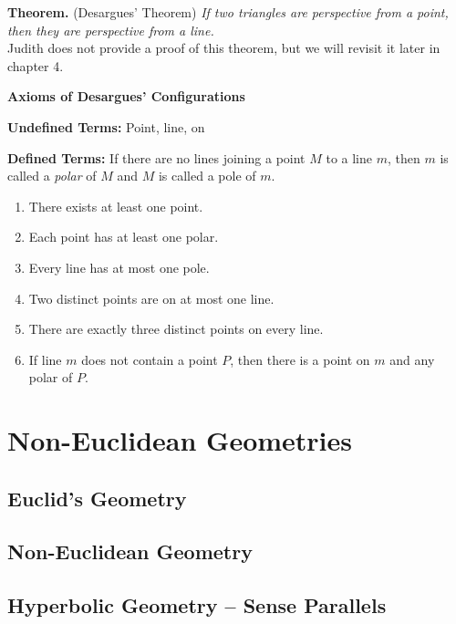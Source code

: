 \documentclass[12pt]{book}
\def\header #1{\noindent\textbf{#1}}
\begin{document}
\header{Theorem.} (Desargues' Theorem) \textit{If two triangles are perspective from a point, then they are perspective from a line.}\\

\noindent Judith does not provide a proof of this theorem, but we will revisit it later in chapter 4.\\

\noindent\begin{large}\begin{center}
\textbf{Axioms of Desargues' Configurations}
\end{center}\end{large}

\noindent\textbf{Undefined Terms:} Point, line, on

\noindent\textbf{Defined Terms:} If there are no lines joining a point $M$ to a line $m$, then $m$ is called a \textit{polar} of $M$ and $M$ is called a pole of $m$.

\begin{enumerate}[nolistsep, label=\textbf{Axiom D\arabic*.}]
\item There exists at least one point.
\item Each point has at least one polar.
\item Every line has at most one pole.
\item Two distinct points are on at most one line.
\item There are exactly three distinct points on every line.
\item If line $m$ does not contain a point $P$, then there is a point on $m$ and any polar of $P$.
\end{enumerate}




\chapter{Non-Euclidean Geometries}
\section{Euclid's Geometry}
\section{Non-Euclidean Geometry}
\section{Hyperbolic Geometry -- Sense Parallels}
\end{document}
